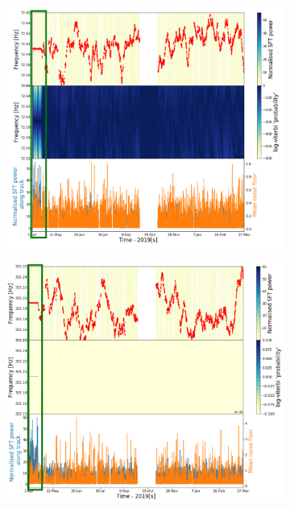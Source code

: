\begin{figure}[hpt]
	\centering
	\begin{subfigure}[h]{0.49\textwidth}
		\includegraphics[width=\textwidth]{C6_detchar/linemixing/track_F72_55_72_65.pdf}
		\caption{\label{detchar:soap:calibrationlinemixing:1}}
	\end{subfigure}
\begin{subfigure}[h]{0.49\textwidth}
	\includegraphics[width=\textwidth]{C6_detchar/linemixing/track_F315_15_315_25.pdf}
	\caption{\label{detchar:soap:calibrationlinemixing:2}}
\end{subfigure}


\end{figure}
